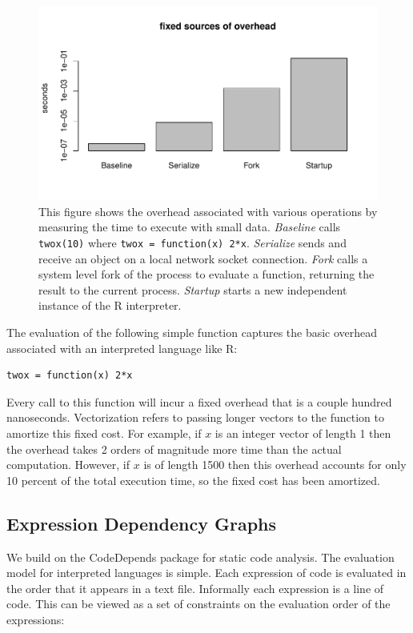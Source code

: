 \documentclass[12pt]{article}
\begin{document}
\begin{figure}
\centering
\includegraphics[width=.8\linewidth]{compute_times/overhead}

    \caption{
        This figure shows the overhead associated with various
    operations by measuring the time to execute with small data. 
    \emph{Baseline} calls \texttt{twox(10)} where \texttt{twox = function(x) 2*x}.
    \emph{Serialize} sends and receive an object on a local network socket connection.
    \emph{Fork} calls a system level fork of the process to evaluate a
    function, returning the result to the current process.
    \emph{Startup} starts a new independent instance of the R interpreter.
    }
\label{fig:overhead}
\end{figure}

The evaluation of the following simple
function captures the basic overhead associated with an interpreted
language like R:
\begin{verbatim}
twox = function(x) 2*x
\end{verbatim}
Every call to this function will incur a fixed overhead that is a couple
hundred nanoseconds. Vectorization refers to passing longer vectors to the
function to amortize this fixed cost. For example, if $x$ is an integer
vector of length 1 then the overhead takes 2 orders of magnitude more time
than the actual computation. However, if $x$ is of length 1500 then this
overhead accounts for only 10 percent of the total execution time, so the
fixed cost has been amortized.

\subsection{Expression Dependency Graphs}

\label{sec:expression_dependency}

We build on the CodeDepends package \cite{R-CodeDepends} for static code
analysis.  The evaluation model for interpreted languages is simple. Each
expression of code is evaluated in the order that it appears in a text
file. Informally each expression is a line of code. This can be viewed as a
set of constraints on the evaluation order of the expressions:
\end{document}
